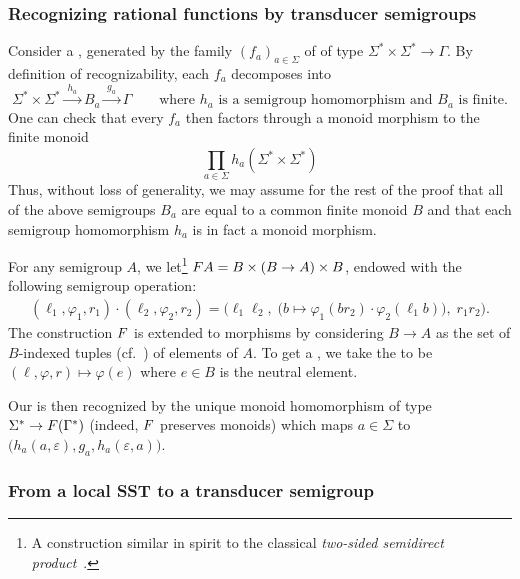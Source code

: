 \subsubsection{Recognizing rational functions by transducer semigroups}
\label{sec:rational}

Consider a , generated by the family $(f_a)_{a\in\Sigma}$ of  of type
$\Sigma^* \times \Sigma^* \to \Gamma$. By
definition of recognizability, each $f_a$ decomposes into
\[ \Sigma^* \times \Sigma^* \xrightarrow{\;h_a\;} B_a \xrightarrow{\;g_a\;} \Gamma
  \qquad\text{where $h_a$ is a semigroup homomorphism and $B_a$ is finite.} \]
One can check that every $f_a$ then factors through a monoid morphism to the
finite monoid
\[ \prod_{a \in \Sigma} h_a(\Sigma^* \times \Sigma^*) \]
Thus, without loss of generality, we may assume for the rest of the proof that
all of the above semigroups $B_a$ are equal to a common finite monoid $B$ and
that each semigroup homomorphism $h_a$ is in fact a monoid morphism.

For any semigroup $A$, we let\footnote{A construction similar in
  spirit to the classical \emph{two-sided semidirect
    product}~\cite[\S6]{rhodes1989kernel}.} $\functor A = B \times (B\to A) \times B$, endowed with the following semigroup operation:
\begin{align*}
  (\ell_1,\varphi_1,r_1) \cdot (\ell_2,\varphi_2,r_2) = \Big(\ell_1\ell_2,\; \big(b  \mapsto \varphi_1(br_2) \cdot \varphi_2(\ell_1b)\big),\; r_1r_2\Big).
\end{align*}
The construction $\functor$ is extended to morphisms by considering $B\to A$ as the set of $B$-indexed tuples (cf.~) of
elements of $A$. To get a , we take the  to
be $(\ell,\varphi,r) \mapsto \varphi(e)$ where $e \in B$ is the neutral element.

Our  is then recognized by the unique monoid homomorphism of
type $\Sigma^* \to \functor(\Gamma^*)$ (indeed, $\functor$ preserves monoids)
which maps $a \in \Sigma$ to
$\big(h_a(a,\varepsilon),g_a,h_a(\varepsilon,a)\big)$.

\subsubsection{From a local SST to a transducer semigroup}
\label{sec:local}

